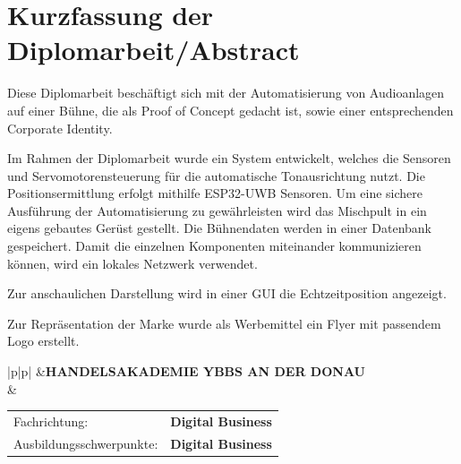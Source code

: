 \chapter*{Kurzfassung der Diplomarbeit/Abstract} 

Diese Diplomarbeit beschäftigt sich mit der Automatisierung von Audioanlagen auf einer Bühne, die als Proof of Concept gedacht ist, sowie einer entsprechenden Corporate Identity.

 Im Rahmen der Diplomarbeit wurde ein System entwickelt, welches die Sensoren und Servomotorensteuerung für die automatische Tonausrichtung nutzt. Die Positionsermittlung erfolgt mithilfe ESP32-UWB Sensoren. Um eine sichere Ausführung der Automatisierung zu gewährleisten wird das Mischpult in ein eigens gebautes Gerüst gestellt. Die Bühnendaten werden in einer Datenbank gespeichert. Damit die einzelnen Komponenten miteinander kommunizieren können, wird ein lokales Netzwerk verwendet.
 
Zur anschaulichen Darstellung wird in einer GUI die Echtzeitposition angezeigt.

Zur Repräsentation der Marke wurde als Werbemittel ein Flyer mit passendem Logo erstellt. 



\clearpage

\newlength{\haklogobreite}
\newlength{\beschriftungsbreite}
\newlength{\feldA}
\newlength{\feldB}

\begin{tabular}{|p{\haklogobreite}|p{\beschriftungsbreite}|}
\hline
{}&{\vspace{0.05em}\textbf{HANDELSAKADEMIE YBBS AN DER DONAU}}\\[1.05em]
 & { \begin{tabular}{p{\feldA} p{\feldB}}
    Fachrichtung:&\textbf{Digital Business}\\
    Ausbildungsschwerpunkte:&\textbf{Digital Business}\\
   \end{tabular}
   }\\
\hline
\end{tabular}

